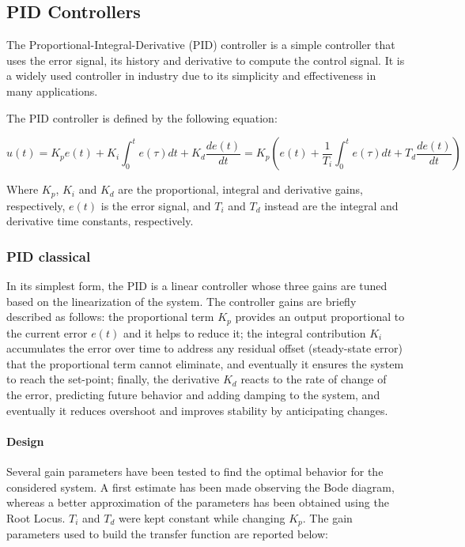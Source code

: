 \subsection{PID Controllers}
\label{subsec:pid_controllers}

The Proportional-Integral-Derivative (PID) controller is a simple controller that uses the error signal, its history and derivative to compute the control signal.
It is a widely used controller in industry due to its simplicity and effectiveness in many applications.

The PID controller is defined by the following equation:

\begin{equation}
    u(t) = K_p e(t) + K_i \int_{0}^{t} e(\tau)dt + K_d \frac{de(t)}{dt} = K_p \left(e(t) + \frac{1}{T_i} \int_{0}^{t} e(\tau)dt + T_d \frac{de(t)}{dt}\right)
\end{equation}

Where $K_p$, $K_i$ and $K_d$ are the proportional, integral and derivative gains, respectively, $e(t)$ is the error signal, and $T_i$ and $T_d$ instead are the integral and derivative time constants, respectively.



\subsubsection{PID classical}
\label{subsubsec:pid_classic}

In its simplest form, the PID is a linear controller whose three gains are tuned based on the linearization of the system.
The controller gains are briefly described as follows: the proportional term $K_p$ provides an output proportional to the current error $e(t)$ and it helps to reduce it; the integral contribution $K_i$ accumulates the error over time to address any residual offset (steady-state error) that the proportional term cannot eliminate, and eventually it ensures the system to reach the set-point; finally, the derivative $K_d$ reacts to the rate of change of the error, predicting future behavior and adding damping to the system, and eventually it reduces overshoot and improves stability by anticipating changes.

\paragraph{Design}

Several gain parameters have been tested to find the optimal behavior for the considered system.
A first estimate  has been made observing the Bode diagram, whereas a better approximation of the parameters has been obtained using the Root Locus.
$T_i$ and $T_d$ were kept constant while changing $K_p$.
The gain parameters used to build the transfer function are reported below:

